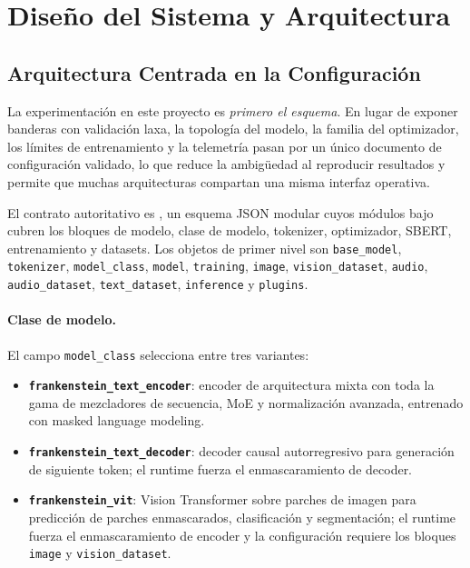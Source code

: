 \section{Diseño del Sistema y Arquitectura}
\label{sec:system-design}

\subsection{Arquitectura Centrada en la Configuración}
\label{sec:config-centric-architecture}

La experimentación en este proyecto es \emph{primero el esquema}. En lugar de exponer banderas con validación laxa, la topología del modelo, la familia del optimizador, los límites de entrenamiento y la telemetría pasan por un único documento de configuración validado, lo que reduce la ambigüedad al reproducir resultados y permite que muchas arquitecturas compartan una misma interfaz operativa.

El contrato autoritativo es , un esquema JSON modular cuyos módulos bajo  cubren los bloques de modelo, clase de modelo, tokenizer, optimizador, SBERT, entrenamiento y datasets. Los objetos de primer nivel son \texttt{base\_model}, \texttt{tokenizer}, \texttt{model\_class}, \texttt{model}, \texttt{training}, \texttt{image}, \texttt{vision\_dataset}, \texttt{audio}, \texttt{audio\_dataset}, \texttt{text\_dataset}, \texttt{inference} y \texttt{plugins}.

\paragraph{Clase de modelo.} El campo \texttt{model\_class} selecciona entre tres variantes:
\begin{itemize}[leftmargin=*]
    \item \textbf{\texttt{frankenstein\_text\_encoder}}: encoder de arquitectura mixta con toda la gama de mezcladores de secuencia, MoE y normalización avanzada, entrenado con masked language modeling.
    \item \textbf{\texttt{frankenstein\_text\_decoder}}: decoder causal autorregresivo para generación de siguiente token; el runtime fuerza el enmascaramiento de decoder.
    \item \textbf{\texttt{frankenstein\_vit}}: Vision Transformer sobre parches de imagen para predicción de parches enmascarados, clasificación y segmentación; el runtime fuerza el enmascaramiento de encoder y la configuración requiere los bloques \texttt{image} y \texttt{vision\_dataset}.
\end{itemize}

